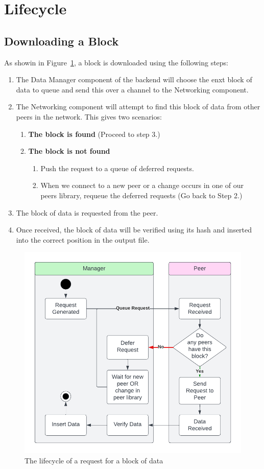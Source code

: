 \section{Lifecycle}

\subsection*{Downloading a Block}

As showin in Figure~\ref{fig:req-life}, a block is downloaded using the following steps:

\begin{enumerate}
  \item The Data Manager component of the backend will choose the enxt block of data to queue and send this over a channel to the Networking component.
  \item The Networking component will attempt to find this block of data from other peers in the network. This gives two scenarios: \begin{enumerate}
    \item \textbf{The block is found} (Proceed to step 3.)
    \item \textbf{The block is not found} \begin{enumerate}
      \item Push the request to a queue of deferred requests.
      \item When we connect to a new peer or a change occurs in one of our peers library, requeue the deferred requests (Go back to Step 2.)
    \end{enumerate}
  \end{enumerate}
  \item The block of data is requested from the peer.
  \item Once received, the block of data will be verified using its hash and inserted into the correct position in the output file.
\end{enumerate}

\begin{figure}[ht]
  \centering
  \includegraphics[width=.75\textwidth]{assets/images/diagrams/request-lifecycle.png}
  \caption{The lifecycle of a request for a block of data}
  \label{fig:req-life}
\end{figure}